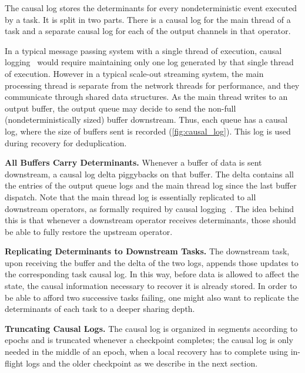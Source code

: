 \documentclass[sigconf]{acmart}
\newcommand{\para}[1]{\vspace{1mm}\noindent\textbf{#1.}}
\begin{document}
The causal log stores the determinants for every nondeterministic event executed by a task. It is split in two parts. There is a causal log for the main thread of a task and a separate causal log for each of the output channels in that operator. 

In a typical message passing system with a single thread of execution, causal logging~\cite{elnozahy1994manetho} would require maintaining only one log generated by that single thread of execution.
However in a typical scale-out streaming system, the main processing thread is separate from the network threads for performance, and they communicate through shared data structures.
As the main thread writes to an output buffer, the output queue may decide to send the non-full (nondeterministically sized) buffer downstream.
Thus, each queue has a causal log, where the size of buffers sent is recorded (\autoref{fig:causal_log}). This log is used during recovery for deduplication.

\para{All Buffers Carry Determinants} Whenever a buffer of data is sent downstream, a causal log delta piggybacks on that buffer. The delta contains all the  entries of the output queue logs and the main thread log since the last buffer dispatch. Note that the main thread log is essentially replicated to all downstream operators, as formally required by causal logging~\cite{elnozahy1994manetho}. The idea behind this is that whenever a downstream operator receives determinants, those should be able to fully restore the upstream operator. 



\para{Replicating Determinants to Downstream Tasks} The downstream task, upon receiving the buffer and the delta of the two logs, appends those updates to the corresponding task causal log. In this way, before data is allowed to affect the state, the causal information necessary to recover it is already stored. In order to be able to afford two successive tasks failing, one might also want to replicate the determinants of each task to a deeper sharing depth. 


\para{Truncating Causal Logs} The causal log is organized in segments according to epochs and is truncated whenever a checkpoint completes; the causal log is only needed in the middle of an epoch, when a local recovery has to complete using in-flight logs and the older checkpoint as we describe in the next section.
\end{document}

